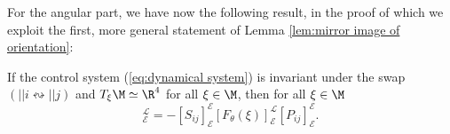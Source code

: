 For the angular part, we have now the following result, in the proof of which we exploit the first, more general statement of Lemma \ref{lem:mirror image of orientation}:
\begin{proposition}
\label{prop: angular permutation invariance}
If the control system (\ref{eq:dynamical system}) is invariant under the swap $(||i \leftrightsquigarrow ||j)$ and $T_{\xi}\M \simeq \R^4$ for all $\xi \in \M$, then for all $\xi \in \M$
\begin{equation}
[F_{\theta}(P_{ij} \xi)]_{\mathcal{E}}^{\mathcal{L}} = - [S_{ij}]_{\mathcal{E}}^{\mathcal{E}} [F_{\theta}(\xi)]_{\mathcal{E}}^{\mathcal{L}} [P_{ij}]_{\mathcal{E}}^{\mathcal{E}}.
\end{equation}
\end{proposition}

